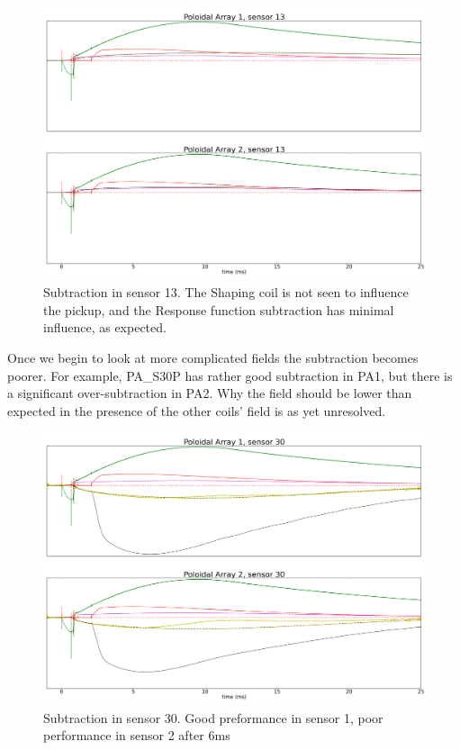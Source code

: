 \documentclass{article}
\begin{document}
\begin{figure}[h!]
\includegraphics[width = \textwidth]{./RF_subtraction_results_vacuum_sensor_13.png}\caption{Subtraction in sensor 13.  The Shaping coil is not seen to influence the pickup, and the Response function subtraction has minimal influence, as expected.}
\label{raw_sig}
\end{figure}
\par
Once we begin to look at more complicated fields the subtraction becomes poorer.  For example, PA\_S30P has rather good subtraction in PA1, but there is a significant over-subtraction in PA2.  Why the field should be lower than expected in the presence of the other coils' field is as yet unresolved.
\begin{figure}[h!]
\includegraphics[width = \textwidth]{./RF_subtraction_results_vacuum_sensor_30.png}\caption{Subtraction in sensor 30.  Good preformance in sensor 1, poor performance in sensor 2 after 6ms}
\label{raw_sig}
\end{figure}
\end{document}
